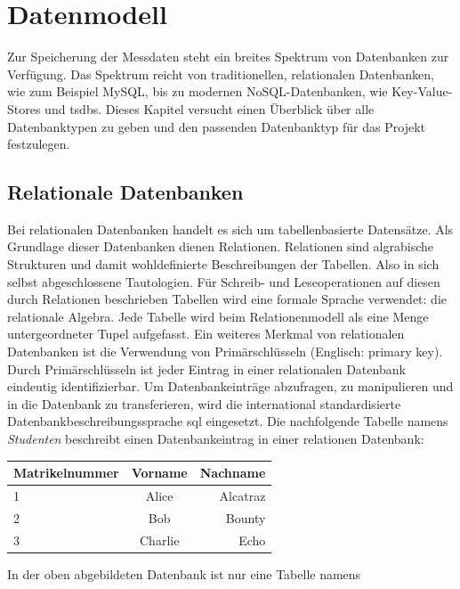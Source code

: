 \documentclass[titlepage]{report}
\begin{document}
\section*{Datenmodell}
Zur Speicherung der Messdaten steht ein breites Spektrum von Datenbanken
zur Verfügung. Das Spektrum reicht von traditionellen, relationalen
Datenbanken, wie zum Beispiel MySQL, bis zu modernen
NoSQL\hyp{}Datenbanken, wie Key\hyp{}Value\hyp{}Stores und \glspl{tsdb}.
Dieses Kapitel versucht einen Überblick über alle Datenbanktypen zu
geben und den passenden Datenbanktyp für das Projekt festzulegen.
\subsection*{Relationale Datenbanken}
Bei relationalen Datenbanken handelt es sich um tabellenbasierte Datensätze.
Als Grundlage dieser Datenbanken dienen Relationen.  Relationen sind
algrabische Strukturen und damit wohldefinierte Beschreibungen der
Tabellen. Also in sich selbst abgeschlossene Tautologien. Für Schreib\hyp{} und
Leseoperationen auf diesen durch Relationen beschrieben Tabellen wird eine
formale Sprache verwendet: die relationale Algebra. Jede Tabelle wird beim
Relationenmodell als eine Menge untergeordneter Tupel aufgefasst\cite[S.
4]{MEIER2013}. Ein weiteres Merkmal von relationalen Datenbanken ist die
Verwendung von Primärschlüsseln (Englisch: primary key). Durch Primärschlüsseln
ist jeder Eintrag in einer relationalen Datenbank eindeutig identifizierbar. Um
Datenbankeinträge abzufragen, zu manipulieren und in die Datenbank zu
transferieren, wird die international standardisierte
Datenbankbeschreibungssprache \gls{sql} eingesetzt. Die nachfolgende Tabelle
namens \emph{Studenten} beschreibt einen Datenbankeintrag in einer relationen
Datenbank:
\begin{center}
    \begin{tabular}{l c r}
        \toprule
        Matrikelnummer & Vorname & Nachname \\
        \midrule
        1              & Alice   & Alcatraz \\
        2              & Bob     & Bounty   \\
        3              & Charlie & Echo     \\
        \bottomrule
    \end{tabular}
\end{center}
In der oben abgebildeten Datenbank ist nur eine Tabelle namens
\end{document}
